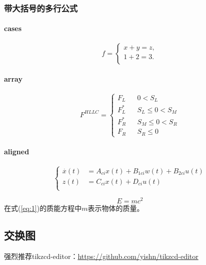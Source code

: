 \subsubsection{带大括号的多行公式}

\paragraph{cases}
$$
    f=
    \begin{cases}
      x + y = z,  \\
      1 + 2 = 3.  \\
    \end{cases}
$$

\paragraph{array}
$$ F^{HLLC}=\left\{
\begin{array}{rcl}
F_L       &      & {0      <      S_L}\\
F^*_L     &      & {S_L \leq 0 < S_M}\\
F^*_R     &      & {S_M \leq 0 < S_R}\\
F_R       &      & {S_R \leq 0}
\end{array} \right. $$
    
\paragraph{aligned}
\begin{equation}
    \left\{
     \begin{aligned}
     \overset{.}x(t) &=A_{ci}x(t)+B_{1ci}w(t)+B_{2ci}u(t)  \\
     z(t) &=C_{ci}x(t)+D_{ci}u(t) \\
     \end{aligned}
     \right.
\end{equation}

\begin{equation}
E = mc^{2}
\label{eq:1}
\end{equation}
在式(\ref{eq:1})的质能方程中$m$表示物体的质量。

\subsection{交换图}
\begin{sloppypar}
强烈推荐tikzcd-editor：\url{https://github.com/yishn/tikzcd-editor}
\end{sloppypar}

